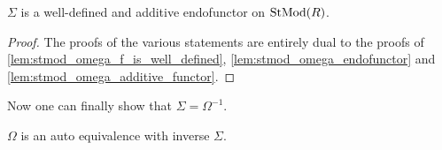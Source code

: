 \begin{lemma}
    \label{lem:stmod_sigma_well-defined_additive_endofunctor}
    \( \Sigma \) is a well-defined and additive endofunctor on \( \operatorname{StMod}(R) \).
\end{lemma}
\begin{proof}
    The proofs of the various statements are entirely dual to the proofs of \autoref{lem:stmod_omega_f_is_well_defined}, \autoref{lem:stmod_omega_endofunctor} and \autoref{lem:stmod_omega_additive_functor}.
\end{proof}

Now one can finally show that \( \Sigma = \Omega^{-1} \).

\begin{theorem}
    \( \Omega \) is an auto equivalence with inverse \( \Sigma \).
\end{theorem}
